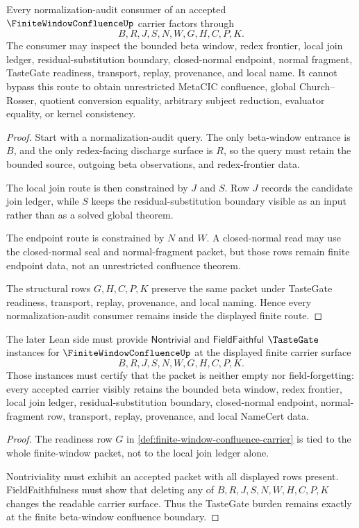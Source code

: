 \begin{theorem}
\label{thm:finite-window-confluence-normalization-audit-handoff}
Every normalization-audit consumer of an accepted $\FiniteWindowConfluenceUp$ carrier factors through
$$
B,R,J,S,N,W,G,H,C,P,K .
$$
The consumer may inspect the bounded beta window, redex frontier, local join ledger, residual-substitution boundary, closed-normal endpoint, normal fragment, TasteGate readiness, transport, replay, provenance, and local name. It cannot bypass this route to obtain unrestricted MetaCIC confluence, global Church--Rosser, quotient conversion equality, arbitrary subject reduction, evaluator equality, or kernel consistency.
\end{theorem}
\begin{proof}
Start with a normalization-audit query. The only beta-window entrance is $B$, and the only redex-facing discharge surface is $R$, so the query must retain the bounded source, outgoing beta observations, and redex-frontier data.

The local join route is then constrained by $J$ and $S$. Row $J$ records the candidate join ledger, while $S$ keeps the residual-substitution boundary visible as an input rather than as a solved global theorem.

The endpoint route is constrained by $N$ and $W$. A closed-normal read may use the closed-normal seal and normal-fragment packet, but those rows remain finite endpoint data, not an unrestricted confluence theorem.

The structural rows $G,H,C,P,K$ preserve the same packet under TasteGate readiness, transport, replay, provenance, and local naming. Hence every normalization-audit consumer remains inside the displayed finite route.
\end{proof}

\begin{theorem}
\label{thm:finite-window-confluence-tastegate-readiness}
The later Lean side must provide $\mathsf{Nontrivial}$ and $\mathsf{FieldFaithful}$ $\TasteGate$ instances for $\FiniteWindowConfluenceUp$ at the displayed finite carrier surface
$$
B,R,J,S,N,W,G,H,C,P,K .
$$
Those instances must certify that the packet is neither empty nor field-forgetting: every accepted carrier visibly retains the bounded beta window, redex frontier, local join ledger, residual-substitution boundary, closed-normal endpoint, normal-fragment row, transport, replay, provenance, and local NameCert data.
\end{theorem}
\begin{proof}
The readiness row $G$ in \autoref{def:finite-window-confluence-carrier} is tied to the whole finite-window packet, not to the local join ledger alone.

Nontriviality must exhibit an accepted packet with all displayed rows present. FieldFaithfulness must show that deleting any of $B,R,J,S,N,W,H,C,P,K$ changes the readable carrier surface. Thus the TasteGate burden remains exactly at the finite beta-window confluence boundary.
\end{proof}

